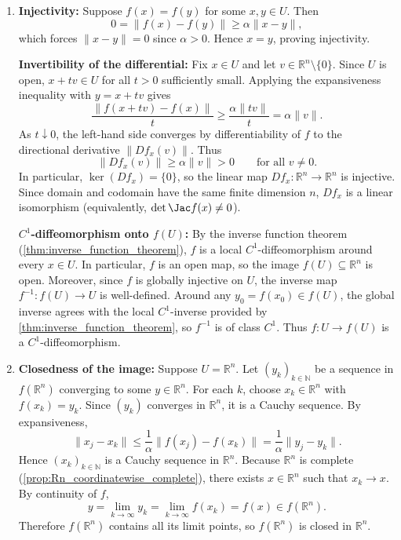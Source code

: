 \begin{exercisesolution}
\label{sol:expansive_local_diffeomorphism_global_inverse}
\begin{enumerate}[label=\textbf{(\alph*)}]
  \item \textbf{Injectivity:} Suppose $f(x) = f(y)$ for some $x, y \in U$. Then
    \[0 = \|f(x) - f(y)\| \geq \alpha \|x - y\|,\]
    which forces $\|x - y\| = 0$ since $\alpha > 0$. Hence $x = y$, proving injectivity.

    \textbf{Invertibility of the differential:} Fix $x \in U$ and let $v \in \mathbb{R}^n \setminus \{0\}$.
    Since $U$ is open, $x + tv \in U$ for all $t > 0$ sufficiently small. Applying the expansiveness
    inequality with $y = x + tv$ gives
    \[\frac{\|f(x + tv) - f(x)\|}{t} \geq \frac{\alpha \|tv\|}{t} = \alpha \|v\|.\]
    As $t \downarrow 0$, the left-hand side converges by differentiability of $f$ to the directional
    derivative $\|Df_x(v)\|$. Thus
    \[\|Df_x(v)\| \geq \alpha \|v\| > 0 \qquad \text{for all } v \neq 0.\]
    In particular, $\ker(Df_x) = \{0\}$, so the linear map $Df_x : \mathbb{R}^n \to \mathbb{R}^n$ is
    injective. Since domain and codomain have the same finite dimension $n$, $Df_x$ is a linear
    isomorphism (equivalently, $\det \Jac f(x) \neq 0$).

    \textbf{$C^1$-diffeomorphism onto $f(U)$:} By the inverse function theorem
    (\cref{thm:inverse_function_theorem}), $f$ is a local $C^1$-diffeomorphism around every $x \in U$.
    In particular, $f$ is an open map, so the image $f(U) \subseteq \mathbb{R}^n$ is open.
    Moreover, since $f$ is globally injective on $U$, the inverse map $f^{-1} : f(U) \to U$ is well-defined.
    Around any $y_0 = f(x_0) \in f(U)$, the global inverse agrees with the local $C^1$-inverse provided
    by \cref{thm:inverse_function_theorem}, so $f^{-1}$ is of class $C^1$. Thus $f : U \to f(U)$ is a
    $C^1$-diffeomorphism.

  \item \textbf{Closedness of the image:} Suppose $U = \mathbb{R}^n$. Let $(y_k)_{k \in \mathbb{N}}$ be
    a sequence in $f(\mathbb{R}^n)$ converging to some $y \in \mathbb{R}^n$. For each $k$, choose
    $x_k \in \mathbb{R}^n$ with $f(x_k) = y_k$.
    Since $(y_k)$ converges in $\mathbb{R}^n$, it is a Cauchy sequence. By expansiveness,
    \[\|x_j - x_k\| \leq \frac{1}{\alpha} \|f(x_j) - f(x_k)\| = \frac{1}{\alpha} \|y_j - y_k\|.\]
    Hence $(x_k)_{k \in \mathbb{N}}$ is a Cauchy sequence in $\mathbb{R}^n$. Because $\mathbb{R}^n$ is
    complete (\cref{prop:Rn_coordinatewise_complete}), there exists $x \in \mathbb{R}^n$ such that $x_k \to x$.
    By continuity of $f$,
    \[y = \lim_{k \to \infty} y_k = \lim_{k \to \infty} f(x_k) = f(x) \in f(\mathbb{R}^n).\]
    Therefore $f(\mathbb{R}^n)$ contains all its limit points, so $f(\mathbb{R}^n)$ is closed in $\mathbb{R}^n$.


\end{enumerate}
\end{exercisesolution}
